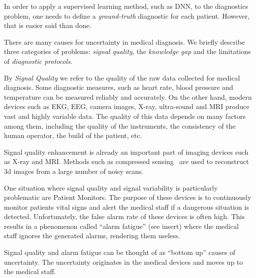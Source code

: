 \documentclass[11pt]{pnas-new}
\begin{document}
In order to apply a supervised learning method, such as  DNN, to the
diagnostics problem, one needs to define a {\em ground-truth} diagnostic for each
patient. However, that is easier said than done. 


There are many causes for uncertainty in medical diagnosis. We briefly
describe three categories of problems: {\em signal quality}, the {\em
  knowledge gap} and the limitations of {\em diagnostic protocols}.

By {\em Signal Quality} we refer to the quality of the raw data
collected for medical diagnosis. Some diagnostic measures, such
as heart rate, blood pressure and temperature can be measured reliably
and accurately. On the other hand, modern
devices such as EKG, EEG, camera images, X-ray, ultra-sound and MRI
produce vast and highly variable data. The quality of this data
depends on many factors among them, including the quality of the instruments, the
consistency of the human operator, the build of the patient, etc.

Signal quality enhancement is already an important part of imaging
devices such as X-ray and MRI. Methods such as compressed
sensing~\cite{} are used to reconstruct 3d images from a large number
of noisy scans.


  One situation where signal quality and signal variability is
particularly problematic are Patient Monitors. The purpose of these
devices is to continuously monitor patients vital signs and alert the
medical staff if a dangerous situation is detected. Unfortunately, the
false alarm rate of these devices is often high. This results in a
phenomenon called ``alarm fatigue'' (see insert) where the medical staff ignores
the generated alarms, rendering them useless.

Signal quality and alarm fatigue can be thought of as ``bottom up''
causes of uncertainty. The uncertainty originates in the medical
devices and moves up to the medical staff.
\end{document}
